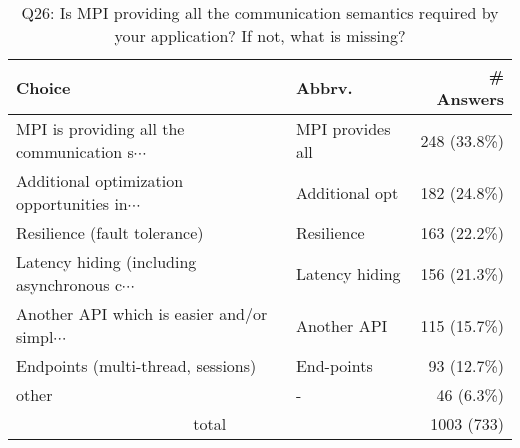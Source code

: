 \begin{table}[htb]%
\begin{center}%
\caption{Q26: Is MPI providing all the communication semantics required by your application? If not, what is missing?}%
\label{tab:Q26-ans}%
\begin{tabular}{l|l|r}%
\hline%
Choice & Abbrv. & \# Answers \\%
\hline%
{\small MPI is providing all the communication s$\cdots$} & MPI provides all & 248 (33.8\%) \\%
{\small Additional optimization opportunities in$\cdots$} & Additional opt & 182 (24.8\%) \\%
Resilience (fault tolerance) & Resilience & 163 (22.2\%) \\%
{\small Latency hiding (including asynchronous c$\cdots$} & Latency hiding & 156 (21.3\%) \\%
{\small Another API which is easier and/or simpl$\cdots$} & Another API & 115 (15.7\%) \\%
Endpoints (multi-thread, sessions) & End-points & 93 (12.7\%) \\%
other & - & 46 (6.3\%) \\%
\hline%
\multicolumn{2}{c}{total} & 1003 (733)\\%
\hline%
\end{tabular}%
\end{center}%
\end{table}%
